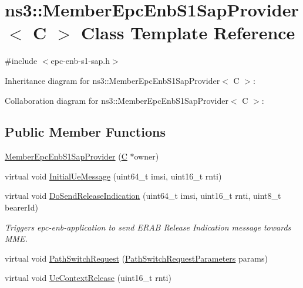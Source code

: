 \hypertarget{classns3_1_1MemberEpcEnbS1SapProvider}{}\section{ns3\+:\+:Member\+Epc\+Enb\+S1\+Sap\+Provider$<$ C $>$ Class Template Reference}
\label{classns3_1_1MemberEpcEnbS1SapProvider}


{\ttfamily \#include $<$epc-\/enb-\/s1-\/sap.\+h$>$}



Inheritance diagram for ns3\+:\+:Member\+Epc\+Enb\+S1\+Sap\+Provider$<$ C $>$\+:


Collaboration diagram for ns3\+:\+:Member\+Epc\+Enb\+S1\+Sap\+Provider$<$ C $>$\+:
\subsection*{Public Member Functions}
\begin{DoxyCompactItemize}
\item 
\hyperlink{classns3_1_1MemberEpcEnbS1SapProvider_a2e5b1fc37c8619d749ad84ed63299758}{Member\+Epc\+Enb\+S1\+Sap\+Provider} (\hyperlink{loss__COST231__small__cities__urban_8m_aaa53ca0b650dfd85c4f59fa156f7a2cc}{C} $\ast$owner)
\item 
virtual void \hyperlink{classns3_1_1MemberEpcEnbS1SapProvider_af0a89902a98ef499c4898635ba48641e}{Initial\+Ue\+Message} (uint64\+\_\+t imsi, uint16\+\_\+t rnti)
\item 
virtual void \hyperlink{classns3_1_1MemberEpcEnbS1SapProvider_a2a5a3a0253c0bd9147cd2bd47c5c5fca}{Do\+Send\+Release\+Indication} (uint64\+\_\+t imsi, uint16\+\_\+t rnti, uint8\+\_\+t bearer\+Id)
\begin{DoxyCompactList}\small\item\em Triggers epc-\/enb-\/application to send E\+R\+AB Release Indication message towards M\+ME. \end{DoxyCompactList}\item 
virtual void \hyperlink{classns3_1_1MemberEpcEnbS1SapProvider_ac46f33e95467fc3ab45763bba64791eb}{Path\+Switch\+Request} (\hyperlink{structns3_1_1EpcEnbS1SapProvider_1_1PathSwitchRequestParameters}{Path\+Switch\+Request\+Parameters} params)
\item 
virtual void \hyperlink{classns3_1_1MemberEpcEnbS1SapProvider_a37e4302945cdca21a9ec7bda2e3b60cc}{Ue\+Context\+Release} (uint16\+\_\+t rnti)
\end{DoxyCompactItemize}
